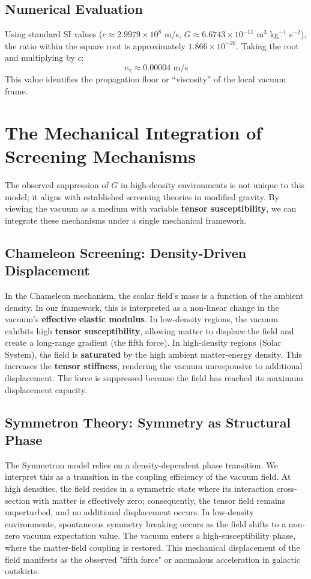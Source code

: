 \documentclass[12pt,a4paper]{article}
\begin{document}
\subsection{Numerical Evaluation}
Using standard SI values ($c \approx 2.9979 \times 10^8$ m/s, $G \approx 6.6743 \times 10^{-11}$ m$^3$ kg$^{-1}$ s$^{-2}$), the ratio within the square root is approximately $1.866 \times 10^{-26}$. Taking the root and multiplying by $c$:
\begin{equation}
v_{\gamma} \approx 0.00004 \text{ m/s}
\end{equation}
This value identifies the propagation floor or ``viscosity'' of the local vacuum frame.



\section{The Mechanical Integration of Screening Mechanisms}
The observed suppression of $G$ in high-density environments is not unique to this model; it aligns with established screening theories in modified gravity. By viewing the vacuum as a medium with variable \textbf{tensor susceptibility}, we can integrate these mechanisms under a single mechanical framework.

\subsection{Chameleon Screening: Density-Driven Displacement}
In the Chameleon mechanism, the scalar field's mass is a function of the ambient density. In our framework, this is interpreted as a non-linear change in the vacuum's \textbf{effective elastic modulus}. In low-density regions, the vacuum exhibits high \textbf{tensor susceptibility}, allowing matter to displace the field and create a long-range gradient (the fifth force). In high-density regions (Solar System), the field is \textbf{saturated} by the high ambient matter-energy density. This increases the \textbf{tensor stiffness}, rendering the vacuum unresponsive to additional displacement. The force is suppressed because the field has reached its maximum displacement capacity.



\subsection{Symmetron Theory: Symmetry as Structural Phase}
The Symmetron model relies on a density-dependent phase transition. We interpret this as a transition in the coupling efficiency of the vacuum field. At high densities, the field resides in a symmetric state where its interaction cross-section with matter is effectively zero; consequently, the tensor field remains unperturbed, and no additional displacement occurs. In low-density environments, spontaneous symmetry breaking occurs as the field shifts to a non-zero vacuum expectation value. The vacuum enters a high-susceptibility phase, where the matter-field coupling is restored. This mechanical displacement of the field manifests as the observed "fifth force" or anomalous acceleration in galactic outskirts.
\end{document}
